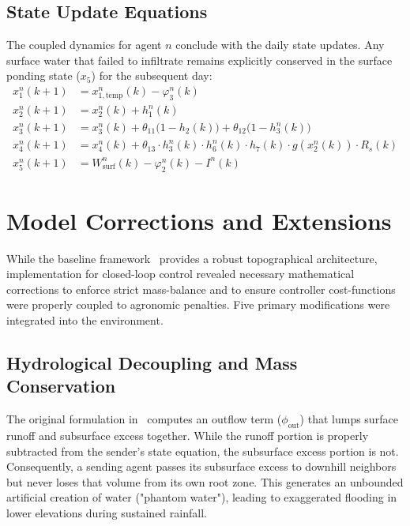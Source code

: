 \subsection{State Update Equations}

The coupled dynamics for agent $n$ conclude with the daily state updates. Any surface water that failed to infiltrate remains explicitly conserved in the surface ponding state ($x_5$) for the subsequent day:
\begin{align}
    x_1^n(k+1) &= x_{1,\text{temp}}^n(k) - \varphi_3^n(k) \\
    x_2^n(k+1) &= x_2^n(k) + h_1^n(k) \\
    x_3^n(k+1) &= x_3^n(k) + \theta_{11}\big(1 - h_2(k)\big) + \theta_{12}\big(1 - h_3^n(k)\big) \\
    x_4^n(k+1) &= x_4^n(k) + \theta_{13} \cdot h_3^n(k) \cdot h_6^n(k) \cdot h_7(k) \cdot g(x_2^n(k)) \cdot R_s(k) \\
    x_5^n(k+1) &= W_{\text{surf}}^n(k) - \varphi_2^n(k) - I^n(k)
\end{align}

\section{Model Corrections and Extensions}
\label{sec:corrections}

While the baseline framework~\cite{Lopezjimenez2024} provides a robust topographical architecture, implementation for closed-loop control revealed necessary mathematical corrections to enforce strict mass-balance and to ensure controller cost-functions were properly coupled to agronomic penalties. Five primary modifications were integrated into the environment.

\subsection{Hydrological Decoupling and Mass Conservation}

The original formulation in~\cite{Lopezjimenez2024} computes an outflow term ($\phi_{\text{out}}$) that lumps surface runoff and subsurface excess together. While the runoff portion is properly subtracted from the sender's state equation, the subsurface excess portion is not. Consequently, a sending agent passes its subsurface excess to downhill neighbors but never loses that volume from its own root zone. This generates an unbounded artificial creation of water ("phantom water"), leading to exaggerated flooding in lower elevations during sustained rainfall. 

